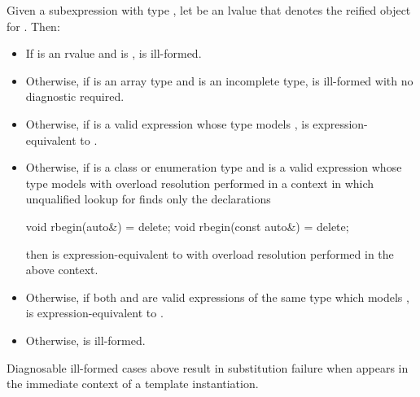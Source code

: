 \pnum
Given a subexpression  with type ,
let  be an lvalue that denotes the reified object for .
Then:

\begin{itemize}
\item
  If  is an rvalue and
   is ,
   is ill-formed.

\item
  Otherwise, if  is an array type and
   is an incomplete type,
   is ill-formed with no diagnostic required.

\item
  Otherwise, if 
  is a valid expression whose type models
  ,
   is expression-equivalent to
  .

\item
  Otherwise, if  is a class or enumeration type and
  is a valid expression whose type models
  with overload resolution performed in a context in which
  unqualified lookup for  finds only the declarations
\begin{codeblock}
void rbegin(auto&) = delete;
void rbegin(const auto&) = delete;
\end{codeblock}
  then  is expression-equivalent to
  with overload resolution performed in the above context.

\item
  Otherwise, if both  and 
  are valid expressions of the same type which models
  ,
   is expression-equivalent to
  .

\item
  Otherwise,  is ill-formed.
\end{itemize}

\pnum
\begin{note}
Diagnosable ill-formed cases above result in substitution failure
when 
appears in the immediate context of a template instantiation.
\end{note}

